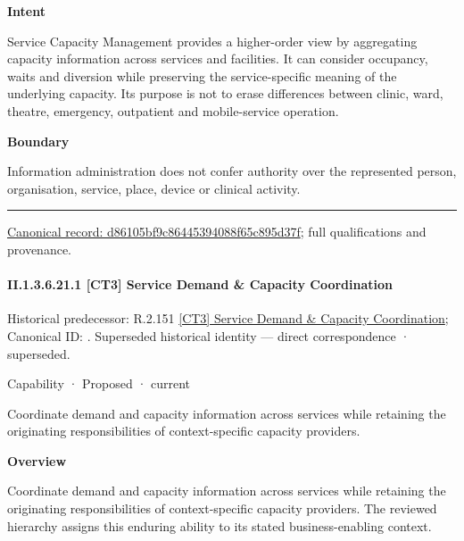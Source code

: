 \textbf{Intent}



Service Capacity Management provides a higher-order view by aggregating capacity information across services and facilities. It can consider occupancy, waits and diversion while preserving the service-specific meaning of the underlying capacity. Its purpose is not to erase differences between clinic, ward, theatre, emergency, outpatient and mobile-service operation.



\textbf{Boundary}



Information administration does not confer authority over the represented person, organisation, service, place, device or clinical activity.



\medskip\hrule\medskip

{\footnotesize \href{../../../../../../../continuum/strategy/capability/d86105bf9c86445394088f65c895d37f.md}{Canonical record: d86105bf9c86445394088f65c895d37f}; full qualifications and provenance.}\par
\paragraph*{II.1.3.6.21.1 [CT3] Service Demand \& Capacity Coordination}
\label{navigation:II.1.3.6.21.1}

{\small Historical predecessor: R.2.151 \hyperref[element:b57081e650f74ad488549fdaa5305bcb]{[CT3] Service Demand \& Capacity Coordination}; Canonical ID: \texttt{}. Superseded historical identity — direct correspondence · superseded.}\par
\label{element:93b5548ce8d04fcd999b97536c1eebf9}
{\small Capability · Proposed · current}\par

Coordinate demand and capacity information across services while retaining the originating responsibilities of context-specific capacity providers.



\textbf{Overview}



Coordinate demand and capacity information across services while retaining the originating responsibilities of context-specific capacity providers. The reviewed hierarchy assigns this enduring ability to its stated business-enabling context.



